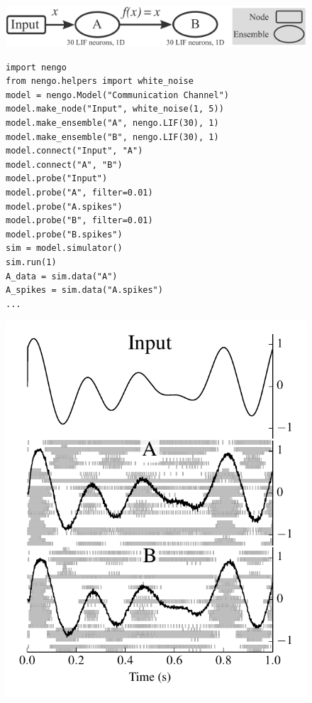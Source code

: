 \documentclass{frontiersSCNS}
\begin{document}
\begin{figure}
\begin{center}
  \includegraphics[width=.73\textwidth]{comm_channel}
  \begin{minipage}{0.37\textwidth}
    \begin{lstlisting}[basicstyle={\footnotesize\ttfamily}]
import nengo
from nengo.helpers import white_noise
model = nengo.Model("Communication Channel")
model.make_node("Input", white_noise(1, 5))
model.make_ensemble("A", nengo.LIF(30), 1)
model.make_ensemble("B", nengo.LIF(30), 1)
model.connect("Input", "A")
model.connect("A", "B")
model.probe("Input")
model.probe("A", filter=0.01)
model.probe("A.spikes")
model.probe("B", filter=0.01)
model.probe("B.spikes")
sim = model.simulator()
sim.run(1)
A_data = sim.data("A")
A_spikes = sim.data("A.spikes")
...
    \end{lstlisting}
  \end{minipage}
  \begin{minipage}{0.3\textwidth}
    \includegraphics[width=\textwidth]{comm_channel_res}

\end{minipage}
\end{center}
\end{figure}
\end{document}
